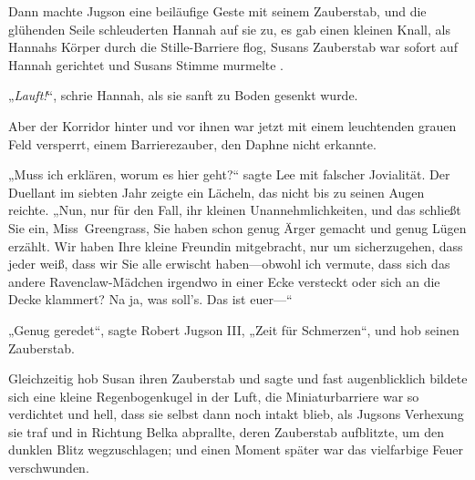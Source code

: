 Dann machte Jugson eine beiläufige Geste mit seinem Zauberstab, und die glühenden Seile schleuderten Hannah auf sie zu, es gab einen kleinen Knall, als Hannahs Körper durch die Stille-Barriere flog, Susans Zauberstab war sofort auf Hannah gerichtet und Susans Stimme murmelte .

„\emph{Lauft!}“, schrie Hannah, als sie sanft zu Boden gesenkt wurde.

Aber der Korridor hinter und vor ihnen war jetzt mit einem leuchtenden grauen Feld versperrt, einem Barrierezauber, den Daphne nicht erkannte.

„Muss ich erklären, worum es hier geht?“ sagte Lee mit falscher Jovialität. Der Duellant im siebten Jahr zeigte ein Lächeln, das nicht bis zu seinen Augen reichte. „Nun, nur für den Fall, ihr kleinen Unannehmlichkeiten, und das schließt Sie ein, Miss~Greengrass, Sie haben schon genug Ärger gemacht und genug Lügen erzählt. Wir haben Ihre kleine Freundin mitgebracht, nur um sicherzugehen, dass jeder weiß, dass wir Sie alle erwischt haben—obwohl ich vermute, dass sich das andere Ravenclaw-Mädchen irgendwo in einer Ecke versteckt oder sich an die Decke klammert? Na ja, was soll’s. Das ist euer—“

„Genug geredet“, sagte Robert Jugson III, „Zeit für Schmerzen“, und hob seinen Zauberstab. 

Gleichzeitig hob Susan ihren Zauberstab und sagte  und fast augenblicklich bildete sich eine kleine Regenbogenkugel in der Luft, die Miniaturbarriere war so verdichtet und hell, dass sie selbst dann noch intakt blieb, als Jugsons Verhexung sie traf und in Richtung Belka abprallte, deren Zauberstab aufblitzte, um den dunklen Blitz wegzuschlagen; und einen Moment später war das vielfarbige Feuer verschwunden.

